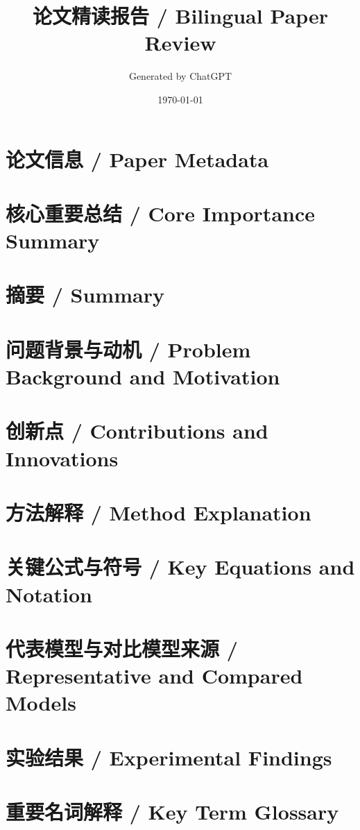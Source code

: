 \documentclass[11pt]{article}
\title{论文精读报告 / Bilingual Paper Review}
\author{Generated by ChatGPT}
\date{\today}
\begin{document}
\maketitle

\section{论文信息 / Paper Metadata}

\section{核心重要总结 / Core Importance Summary}

\section{摘要 / Summary}

\section{问题背景与动机 / Problem Background and Motivation}

\section{创新点 / Contributions and Innovations}

\section{方法解释 / Method Explanation}

\section{关键公式与符号 / Key Equations and Notation}

\section{代表模型与对比模型来源 / Representative and Compared Models}

\section{实验结果 / Experimental Findings}

\section{重要名词解释 / Key Term Glossary}
\end{document}
